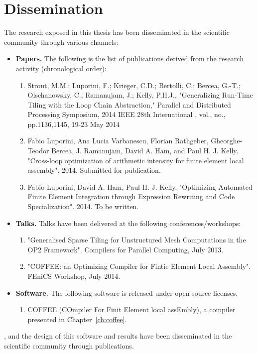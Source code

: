 \section{Dissemination}
The research exposed in this thesis has been disseminated in the scientific community through various channels:
\begin{itemize}
\item \textbf{Papers.} The following is the list of publications derived from the research activity (chronological order):
\begin{enumerate}
\item Strout, M.M.; Luporini, F.; Krieger, C.D.; Bertolli, C.; Bercea, G.-T.; Olschanowsky, C.; Ramanujam, J.; Kelly, P.H.J., "Generalizing Run-Time Tiling with the Loop Chain Abstraction," Parallel and Distributed Processing Symposium, 2014 IEEE 28th International , vol., no., pp.1136,1145, 19-23 May 2014
\item Fabio Luporini, Ana Lucia Varbanescu, Florian Rathgeber, Gheorghe-Teodor Bercea, J. Ramanujam, David A. Ham, and Paul H. J. Kelly. "Cross-loop optimization of arithmetic intensity for finite element local assembly". 2014. Submitted for publication.
\item Fabio Luporini, David A. Ham, Paul H. J. Kelly. "Optimizing Automated Finite Element Integration through Expression Rewriting and Code Specialization". 2014. To be written.
\end{enumerate}
\item \textbf{Talks.} Talks have been delivered at the following conferences/workshops:
\begin{enumerate}
\item "Generalised Sparse Tiling for Unstructured Mesh Computations in the OP2 Framework". Compilers for Parallel Computing, July 2013.
\item "COFFEE: an Optimizing Compiler for Fintie Element Local Assembly". FEniCS Workshop, July 2014.
\end{enumerate}
\item \textbf{Software.} The following software is released under open source licenses.
\begin{enumerate}
\item COFFEE (COmpiler For Finit Element local assEmbly), a compiler presented in Chapter~\ref{ch:coffee}.
\end{enumerate}
\end{itemize}
, and the design of this software and results have
been disseminated in the scientific community through publications.


